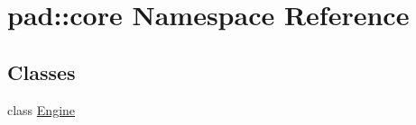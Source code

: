 \hypertarget{namespacepad_1_1core}{}\section{pad\+:\+:core Namespace Reference}
\label{namespacepad_1_1core}
\subsection*{Classes}
\begin{DoxyCompactItemize}
\item 
class \mbox{\hyperlink{classpad_1_1core_1_1_engine}{Engine}}
\end{DoxyCompactItemize}
